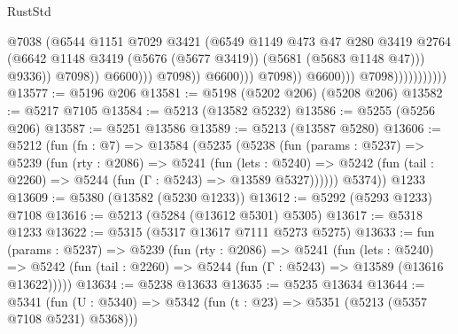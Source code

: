 \begin{lexlean}{RustStd}
\begin{coremodule}
                                                        @7038
                                                        (@6544
                                                          @1151
                                                          @7029
                                                          @3421
                                                          (@6549
                                                            @1149
                                                            @473
                                                            @47
                                                            @280
                                                            @3419
                                                            @2764
                                                            (@6642
                                                              @1148
                                                              @3419
                                                              (@5676 (@5677 @3419))
                                                              (@5681 (@5683 @1148 @47)))
                                                            @9336))
                                                        @7098))
                                                    @6600)))
                                              @7098))
                                          @6600)))
                                    @7098))
                                @6600)))
                          @7098)))))))))))
@13577 := @5196 @206
@13581 := @5198 (@5202 @206) (@5208 @206)
@13582 := @5217 @7105
@13584 := @5213 (@13582 @5232)
@13586 := @5255 (@5256 @206)
@13587 := @5251 @13586
@13589 := @5213 (@13587 @5280)
@13606 := @5212
    (fun (fn : @7) =>
    @13584
      (@5235
        (@5238
          (fun (params : @5237) =>
          @5239
            (fun (rty : @2086) =>
            @5241
              (fun (lets : @5240) =>
              @5242 (fun (tail : @2260) => @5244 (fun (Γ : @5243) => @13589 @5327))))))
        @5374))
    @1233
@13609 := @5380 (@13582 (@5230 @1233))
@13612 := @5292 (@5293 @1233) @7108
@13616 := @5213 (@5284 (@13612 @5301) @5305)
@13617 := @5318 @1233
@13622 := @5315 (@5317 @13617 @7111 @5273 @5275)
@13633 := fun (params : @5237) =>
  @5239
    (fun (rty : @2086) =>
    @5241
      (fun (lets : @5240) =>
      @5242 (fun (tail : @2260) => @5244 (fun (Γ : @5243) => @13589 (@13616 @13622)))))
@13634 := @5238 @13633
@13635 := @5235 @13634
@13644 := @5341
    (fun (U : @5340) => @5342 (fun (t : @23) => @5351 (@5213 (@5357 @7108 @5231) @5368)))

\end{coremodule}
\end{lexlean}

